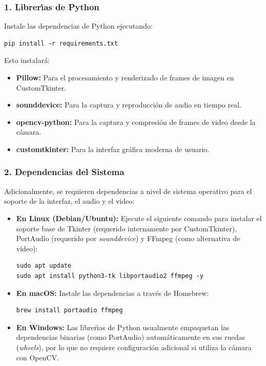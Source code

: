 \documentclass[12pt,a4paper]{article}
\begin{document}
\subsubsection{1. Librer\'{\i}as de Python}
Instale las dependencias de Python ejecutando:
\begin{lstlisting}
pip install -r requirements.txt
\end{lstlisting}
Esto instalar\'a:
\begin{itemize}
    \item \textbf{Pillow:} Para el procesamiento y renderizado de frames de imagen en CustomTkinter.
    \item \textbf{sounddevice:} Para la captura y reproducci\'on de audio en tiempo real.
    \item \textbf{opencv-python:} Para la captura y compresi\'on de frames de video desde la c\'amara.
    \item \textbf{customtkinter:} Para la interfaz gr\'afica moderna de usuario.
\end{itemize}

\subsubsection{2. Dependencias del Sistema}
Adicionalmente, se requieren dependencias a nivel de sistema operativo para el soporte de la interfaz, el audio y el video:
\begin{itemize}
    \item \textbf{En Linux (Debian/Ubuntu):}
    Ejecute el siguiente comando para instalar el soporte base de Tkinter (requerido internamente por CustomTkinter), PortAudio (requerido por \textit{sounddevice}) y FFmpeg (como alternativa de video):
    \begin{lstlisting}
sudo apt update
sudo apt install python3-tk libportaudio2 ffmpeg -y
    \end{lstlisting}
    \item \textbf{En macOS:}
    Instale las dependencias a trav\'es de Homebrew:
    \begin{lstlisting}
brew install portaudio ffmpeg
    \end{lstlisting}
    \item \textbf{En Windows:}
    Las librer\'{\i}as de Python usualmente empaquetan las dependencias binarias (como PortAudio) autom\'aticamente en sus ruedas (\textit{wheels}), por lo que no requiere configuraci\'on adicional si utiliza la c\'amara con OpenCV.
\end{itemize}
\end{document}
